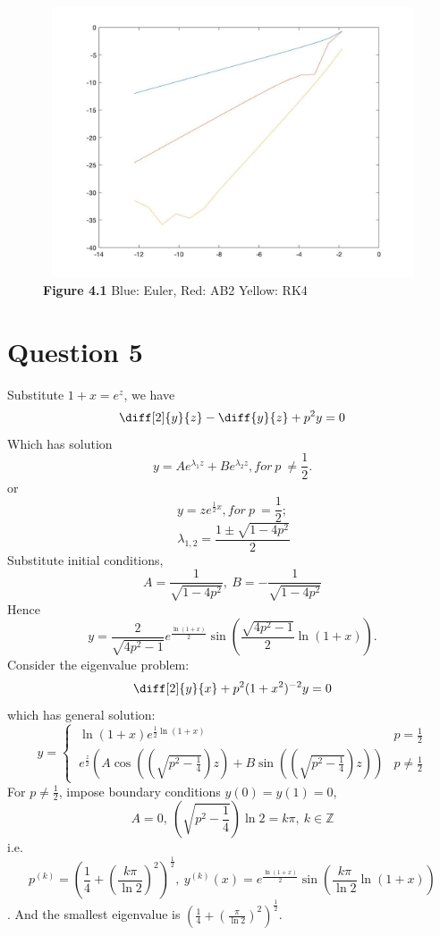 \documentclass[11pt]{article}
\begin{document}
\begin{figure}[H]
\includegraphics[width=13cm, height=8cm]{Q4.jpg}
\caption{\textbf{Figure 4.1} Blue: Euler, Red: AB2  Yellow: RK4}
\end{figure}
\section*{Question 5}
Substitute $1+x=e^{z}$, we have
$$\diff[2]{y}{z} - \diff{y}{z} + p^{2}y=0$$
Which has solution 
$$y = Ae^{\lambda_{1}z}+Be^{\lambda_{2}z}, for\ p\ \neq \frac{1}{2}.$$
or
$$ y=ze^{\frac{1}{2}x}, for\ p\ = \frac{1}{2};$$
$$\ \lambda_{1,2} = \frac{1 \pm \sqrt{1-4p^{2}}}{2}$$
Substitute initial conditions,
$$A=\frac{1}{\sqrt{1-4p^{2}}},\ B=-\frac{1}{\sqrt{1-4p^{2}}}$$
Hence$$y = \frac{2}{\sqrt{4p^{2}-1}} e^{\frac{\ln(1+x)}{2}}\sin\left(\frac{\sqrt{4p^{2}-1}}{2} \ln(1+x)\right).$$
Consider the eigenvalue problem:
$$\diff[2]{y}{x} + p^{2}(1+x^{2})^{-2}y=0$$
which has general solution:\[y = 
\begin{cases}
\ \ln(1+x)e^{\frac{1}{2}\ln(1+x)}       & p=\frac{1}{2}\\
\ e^{\frac{z}{2}}\left(A\cos\left(\left(\sqrt{p^{2}-\frac{1}{4}}\right)z\right)+B\sin\left(\left(\sqrt{p^{2}-\frac{1}{4}}\right)z\right)\right) & p \neq \frac{1}{2}
\end{cases}\]
For $p\neq \frac{1}{2}$, impose boundary conditions $y(0)=y(1)=0$, $$A=0,
\ \left(\sqrt{p^{2}-\frac{1}{4}}\right)\ln2=k\pi,\ k \in \mathbb{Z}$$
i.e.
$$p^{(k)}=\left(\frac{1}{4}+\left(\frac{k\pi}{\ln2}\right)^{2}\right)^{\frac{1}{2}},\ y^{(k)}(x) = e^{\frac{\ln(1+x)}{2}}\sin\left(\frac{k\pi}{\ln2}\ln(1+x)\right)$$.
And the smallest eigenvalue is $\left(\frac{1}{4}+\left(\frac{\pi}{\ln2}\right)^{2}\right)^{\frac{1}{2}}$.
\pagebreak
\end{document}

